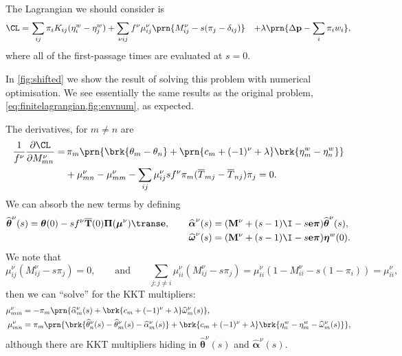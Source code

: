 \documentclass[12pt]{article}
\newcommand{\onev}{\mathbf{e}}
\newcommand{\prm}{p}
\newcommand{\pr}{\mathbf{\prm}}
\newcommand{\eqm}{\pi}
\newcommand{\eq}{\boldsymbol{\eqm}}
\newcommand{\Eqm}{\Pi}
\newcommand{\Eq}{\boldsymbol{\Eqm}}
\newcommand{\fptm}{T}
\newcommand{\fpt}{\mathbf{\fptm}}
\newcommand{\fptbm}{\overline{\fptm}}
\newcommand{\fptb}{\overline{\fpt}}
\newcommand{\etwm}{\eta^w}
\newcommand{\etw}{\boldsymbol{\eta}^w}
\newcommand{\thbm}{\theta}
\newcommand{\thb}{\boldsymbol{\thbm}}
\newcommand{\ombm}{\omega}
\newcommand{\omb}{\boldsymbol{\ombm}}
\newcommand{\albm}{\alpha}
\newcommand{\alb}{\boldsymbol{\albm}}
\newcommand{\wm}{w}
\newcommand{\MMdm}{M}
\newcommand{\MMd}{\mathbf{\MMdm}}
\newcommand{\encm}{K}
\renewcommand{\pdiff}[2]{\frac{\partial #1}{\partial #2}}
\newcommand{\shift}[1]{\widehat{#1}}
\begin{document}
The Lagrangian we should consider is
%
\begin{equation}\label{eq:lshiftlagrangian}
\begin{aligned}
  \CL =&\, \sum_{ij} \eqm_i \encm_{ij} (\etwm_i - \etwm_j)
        +\sum_{\nu i j}  f^\nu \mu^\nu_{ij}\prn{\MMdm^\nu_{ij} -  s (\eqm_j - \delta_{ij}) }
        &+ \lambda \prn{ \Delta\pr - \sum_i \eqm_i \wm_i },
\end{aligned}
\end{equation}
%
where all of the first-passage times are evaluated at \(s = 0\).

In \cref{fig:shifted} we show the result of solving this problem with numerical optimisation.
We see essentially the same results as the original problem, \cref{eq:finitelagrangian,fig:envnum}, as expected.

The derivatives, for \(m \neq n\) are
%
\begin{equation}\label{eq:lshiftderivs}
\begin{aligned}
  \frac{1}{f^\nu} \pdiff{\CL}{\MMdm^\nu_{mn}} = & \,
    \eqm_m \prn{ \brk{\thbm_m - \thbm_n}
     + \prn{{c}_m + (-1)^\nu + \lambda} \brk{\etwm_m - \etwm_n} } \\
     &+ \mu^\nu_{mn} -  \mu^\nu_{mm}
     - \sum_{ij} \mu^\nu_{ij} s f^\nu \eqm_m (\fptbm_{mj} - \fptbm_{nj}) \eqm_j
    = 0.
\end{aligned}
\end{equation}
%
We can absorb the new terms by defining
%
\begin{equation*}
\begin{aligned}
  \shift{\thb}^\nu(s) = \thb(0) - s f^\nu \fptb(0) \Eq (\boldsymbol{\mu}^\nu)\trans \onev,
  \qquad
  \shift{\alb}^\nu(s) &= (\MMd^\nu + (s - 1) \I - s \onev \eq) \shift{\thb}^\nu(s),
  \\
  \shift{\omb}^\nu(s) &= (\MMd^\nu + (s - 1) \I - s \onev \eq) \etw(0).
\end{aligned}
\end{equation*}
%
We note that
%
\begin{equation*}
  \mu^\nu_{ij} (\MMdm^\nu_{ij} - s \eqm_j) = 0,
  \qquad \text{and} \qquad
  \sum_{j: j \neq i} \mu^\nu_{ii} (\MMdm^\nu_{ij} - s \eqm_j)
      = \mu^\nu_{ii} (1 - \MMdm^\nu_{ii} - s (1 - \eqm_i)) = \mu^\nu_{ii},
\end{equation*}
%
then we can ``solve'' for the KKT multipliers:
%
\begin{equation}\label{eq:lshiftsol}
\begin{aligned}
  \mu^\nu_{mm} &= - \eqm_m \prn{ \shift{\albm}^\nu_m(s) 
    + \brk{ {c}_m + (-1)^\nu + \lambda } \shift{\ombm}^\nu_m(s)
    }, \\
  \mu^\nu_{mn} &= \eqm_m \prn{ 
      \brk{ \shift{\thbm}^\nu_n(s) - \shift{\thbm}^\nu_m(s) - \shift{\albm}^\nu_m(s) }
    + \brk{ {c}_m + (-1)^\nu + \lambda } 
        \brk{ \etwm_n - \etwm_m - \shift{\ombm}^\nu_m(s) }
     }, \\
\end{aligned}
\end{equation}
%
although there are KKT multipliers hiding in \(\shift{\thb}^\nu(s)\) and \(\shift{\alb}^\nu(s)\).
\end{document}
